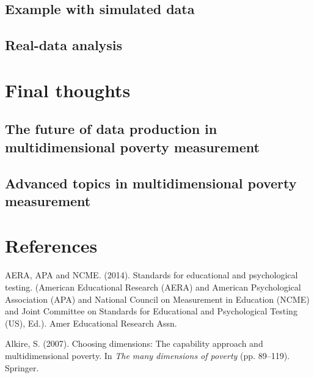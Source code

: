 \documentclass[]{book}
\begin{document}
\hypertarget{example-with-simulated-data}{%
\section{Example with simulated data}\label{example-with-simulated-data}}

\hypertarget{real-data-analysis}{%
\section{Real-data analysis}\label{real-data-analysis}}

\hypertarget{final-thoughts}{%
\chapter{Final thoughts}\label{final-thoughts}}

\hypertarget{the-future-of-data-production-in-multidimensional-poverty-measurement}{%
\section{The future of data production in multidimensional poverty measurement}\label{the-future-of-data-production-in-multidimensional-poverty-measurement}}

\hypertarget{advanced-topics-in-multidimensional-poverty-measurement}{%
\section{Advanced topics in multidimensional poverty measurement}\label{advanced-topics-in-multidimensional-poverty-measurement}}

\hypertarget{references}{%
\chapter{References}\label{references}}

\hypertarget{refs}{}
\leavevmode\hypertarget{ref-AERA2014}{}%
AERA, APA and NCME. (2014). Standards for educational and psychological testing. (American Educational Research (AERA) and American Psychological Association (APA) and National Council on Measurement in Education (NCME) and Joint Committee on Standards for Educational and Psychological Testing (US), Ed.). Amer Educational Research Assn.

\leavevmode\hypertarget{ref-Alkire2007}{}%
Alkire, S. (2007). Choosing dimensions: The capability approach and multidimensional poverty. In \emph{The many dimensions of poverty} (pp. 89--119). Springer.
\end{document}
